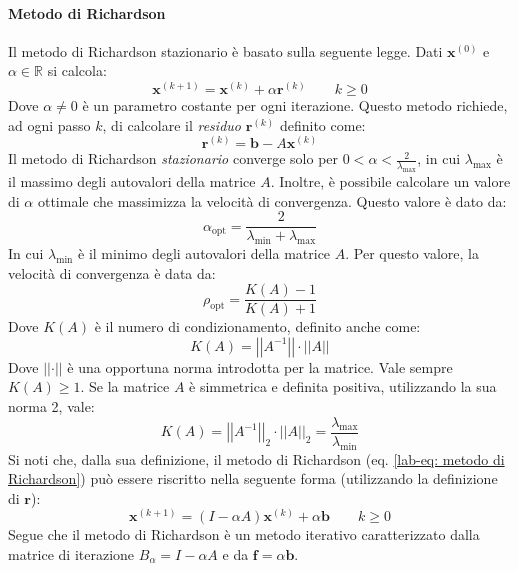 \newpage

\paragraph{Metodo di Richardson}

Il metodo di Richardson stazionario è basato sulla seguente legge. Dati $\mathbf{x}^{\left(0\right)}$ e $\alpha \in \mathbb{R}$ si calcola:
\begin{equation}\label{lab-eq: metodo di Richardson}
    \mathbf{x}^{\left(k+1\right)} = \mathbf{x}^{\left(k\right)} + \alpha\mathbf{r}^{\left(k\right)} \hspace{2em} k \ge 0
\end{equation}
Dove $\alpha \ne 0$ è un parametro costante per ogni iterazione. Questo metodo richiede, ad ogni passo $k$, di calcolare il \emph{residuo} $\mathbf{r}^{\left(k\right)}$ definito come:
\begin{equation*}
    \mathbf{r}^{\left(k\right)} = \mathbf{b} - A \mathbf{x}^{\left(k\right)}
\end{equation*}
Il metodo di Richardson \emph{stazionario} converge solo per $0 < \alpha < \frac{2}{\lambda_{\max}}$, in cui $\lambda_{\max}$ è il massimo degli autovalori della matrice $A$. Inoltre, è possibile calcolare un valore di $\alpha$ ottimale che massimizza la velocità di convergenza. Questo valore è dato da:
\begin{equation*}
    \alpha_{\text{opt}} = \dfrac{2}{\lambda_{\min} + \lambda_{\max}}
\end{equation*}
In cui $\lambda_{\min}$ è il minimo degli autovalori della matrice $A$. Per questo valore, la velocità di convergenza è data da:
\begin{equation*}
    \rho_{\text{opt}} = \dfrac{K\left(A\right) - 1}{K\left(A\right) + 1}
\end{equation*}
Dove $K\left(A\right)$ è il numero di condizionamento, definito anche come:
\begin{equation*}
    K\left(A\right) = \left|\left| A^{-1} \right|\right| \cdot \left|\left| A \right|\right|
\end{equation*}
Dove $\left|\left| \cdot \right|\right|$ è una opportuna norma introdotta per la matrice. Vale sempre $K\left(A\right) \ge 1$. Se la matrice $A$ è simmetrica e definita positiva, utilizzando la sua norma 2, vale:
\begin{equation*}
    K\left(A\right) = \left|\left| A^{-1} \right|\right|_{2} \cdot \left|\left| A \right|\right|_{2} = \dfrac{\lambda_{\max}}{\lambda_{\min}}
\end{equation*}
Si noti che, dalla sua definizione, il metodo di Richardson (eq. \ref{lab-eq: metodo di Richardson}) può essere riscritto nella seguente forma (utilizzando la definizione di $\mathbf{r}$):
\begin{equation}
    \mathbf{x}^{\left(k+1\right)} = \left(I - \alpha A\right) \mathbf{x}^{\left(k\right)} + \alpha \mathbf{b} \hspace{2em} k \ge 0
\end{equation}
Segue che il metodo di Richardson è un metodo iterativo caratterizzato dalla matrice di iterazione $B_{\alpha} = I - \alpha A$ e da $\mathbf{f} = \alpha \mathbf{b}$.

